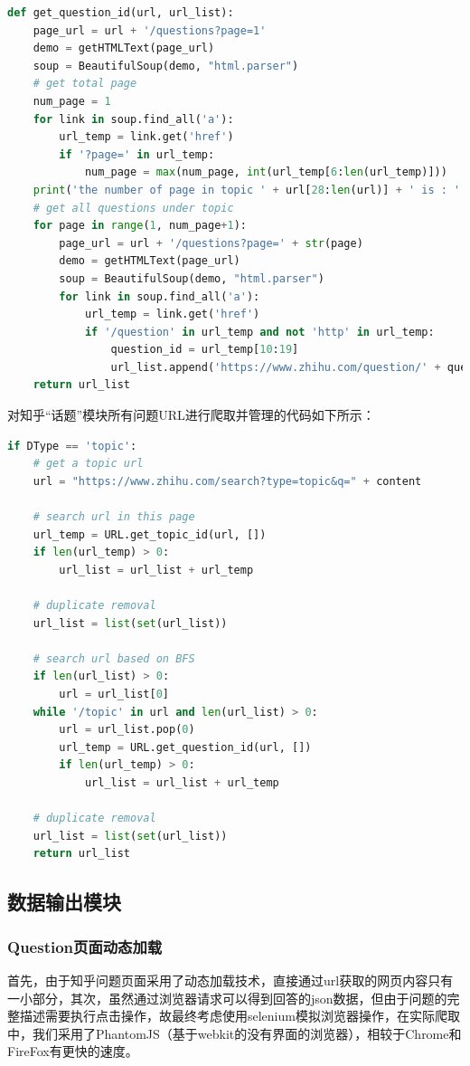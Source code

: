 \documentclass[UTF-8,a4paper, 12pt]{article}
\numberwithin{equation}{section}
\begin{document}
\begin{itemize}
  \begin{lstlisting}[language=python]
  def get_question_id(url, url_list):
    page_url = url + '/questions?page=1'
    demo = getHTMLText(page_url)
    soup = BeautifulSoup(demo, "html.parser")
    # get total page
    num_page = 1
    for link in soup.find_all('a'):
        url_temp = link.get('href')
        if '?page=' in url_temp:
            num_page = max(num_page, int(url_temp[6:len(url_temp)]))
    print('the number of page in topic ' + url[28:len(url)] + ' is : ' + str(num_page))
    # get all questions under topic
    for page in range(1, num_page+1):
        page_url = url + '/questions?page=' + str(page)
        demo = getHTMLText(page_url)
        soup = BeautifulSoup(demo, "html.parser")
        for link in soup.find_all('a'):
            url_temp = link.get('href')
            if '/question' in url_temp and not 'http' in url_temp:
                question_id = url_temp[10:19]
                url_list.append('https://www.zhihu.com/question/' + question_id)
    return url_list
  \end{lstlisting}
  对知乎“话题”模块所有问题URL进行爬取并管理的代码如下所示：
  \begin{lstlisting}[language=python]
    if DType == 'topic':
    # get a topic url
    url = "https://www.zhihu.com/search?type=topic&q=" + content

    # search url in this page
    url_temp = URL.get_topic_id(url, [])
    if len(url_temp) > 0:
        url_list = url_list + url_temp

    # duplicate removal
    url_list = list(set(url_list))

    # search url based on BFS
    if len(url_list) > 0:
        url = url_list[0]
    while '/topic' in url and len(url_list) > 0:
        url = url_list.pop(0)
        url_temp = URL.get_question_id(url, [])
        if len(url_temp) > 0:
            url_list = url_list + url_temp

    # duplicate removal
    url_list = list(set(url_list))
    return url_list
  \end{lstlisting}
\end{itemize}
\newpage

\subsection{数据输出模块}
\subsubsection{Question页面动态加载}
首先，由于知乎问题页面采用了动态加载技术，直接通过url获取的网页内容只有一小部分，其次，虽然通过浏览器请求可以得到回答的json数据，但由于问题的完整描述需要执行点击操作，故最终考虑使用selenium模拟浏览器操作，在实际爬取中，我们采用了PhantomJS（基于webkit的没有界面的浏览器），相较于Chrome和FireFox有更快的速度。
\end{document}
